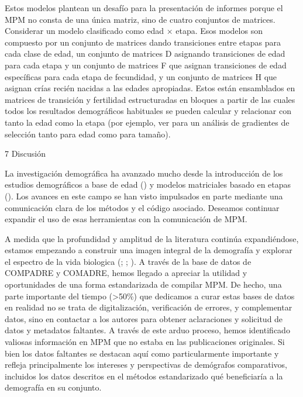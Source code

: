 \documentclass[
]{book}
\theoremstyle{definition}
\theoremstyle{definition}
\theoremstyle{definition}
\theoremstyle{definition}
\theoremstyle{remark}
\begin{document}
Estos modelos plantean un desafío para la presentación de informes porque el MPM no consta de una única matriz, sino de cuatro conjuntos de matrices. Considerar un modelo clasificado como edad × etapa. Esos modelos son compuesto por un conjunto de matrices dando transiciones entre etapas para cada clase de edad, un conjunto de matrices D asignando transiciones de edad para cada etapa y un conjunto de matrices F que asignan transiciones de edad específicas para cada etapa de fecundidad, y un conjunto de matrices H que asignan crías recién nacidas a las edades apropiadas. Estos están ensamblados en matrices de transición y fertilidad estructuradas en bloques a partir de las cuales todos los resultados demográficos habituales se pueden calcular y relacionar con tanto la edad como la etapa (por ejemplo, ver \citet{caswell2013age} para un análisis de gradientes de selección tanto para edad como para tamaño).

7 \textbar{} Discusión

La investigación demográfica ha avanzado mucho desde la introducción de los estudios demográficos a base de edad (\citet{leslie1945use}) y modelos matriciales basado en etapas (\citet{lefkovitch1965study}). Los avances en este campo se han visto impulsados en parte mediante una comunicación clara de los métodos y el código asociado. Deseamos continuar expandir el uso de esas herramientas con la comunicación de MPM.

A medida que la profundidad y amplitud de la literatura continúa expandiéndose, estamos empezando a construir una imagen integral de la demografía y explorar el espectro de la vida biologica (\citet{adler2014functional}; \citet{healy2019animal}; \citet{salguero2017fast}). A través de la base de datos de COMPADRE y COMADRE, hemos llegado a apreciar la utilidad y oportunidades de una forma estandarizada de compilar MPM. De hecho, una parte importante del tiempo (\textgreater50\%) que dedicamos a curar estas bases de datos en realidad no se trata de digitalización, verificación de errores, y complementar datos, sino en contactar a los autores para obtener aclaraciones y solicitud de datos y metadatos faltantes. A través de este arduo proceso, hemos identificado valiosas información en MPM que no estaba en las publicaciones originales. Si bien los datos faltantes se destacan aquí como particularmente importante y refleja principalmente los intereses y perspectivas de demógrafos comparativos, incluidos los datos descritos en el métodos estandarizado qué beneficiaría a la demografía en su conjunto.
\end{document}
